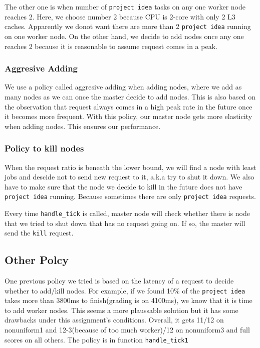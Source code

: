 \documentclass[11pt]{article}
\newcommand{\code}[1]{\texttt{#1}}
\begin{document}
The other one is when number of \code{project idea} tasks on any one worker node reaches 2.
Here, we choose number 2 because CPU is 2-core with only 2 L3 caches.
Apparently we donot want there are more than 2 \code{project idea} running on one worker node.
On the other hand, we decide to add nodes once any one reaches 2 because it is reasonable to assume request comes in a peak.

\subsubsection{Aggresive Adding} %
\label{ssub:aggresive_adding}
We use a policy called aggresive adding when adding nodes, where we add as many nodes as we can once the master decide to add nodes.
This is also based on the observation that request always comes in a high peak rate in the future once it becomes more frequent.
With this policy, our master node gets more elasticity when adding nodes.
This ensures our performance.

\subsubsection{Policy to kill nodes} %
\label{ssub:policy_to_kill_nodes}
When the request ratio is beneath the lower bound, we will find a node with least jobs and descide not to send new request to it, a.k.a try to shut it down.
We also have to make sure that the node we decide to kill in the future does not have \code{project idea} running.
Because sometimes there are only \code{project idea} requests.

Every time \code{handle\_tick} is called, master node will check whether there is node that we tried to shut down that has no request going on.
If so, the master will send the \code{kill} request.


\subsection{Other Polcy} %
\label{sub:other_pol}
One previous policy we tried is based on the latency of a request to decide whether to add/kill nodes.
For example, if we found 10\% of the \code{project idea} takes more than 3800ms to finish(grading is on 4100ms),
we know that it is time to add worker nodes.
This seems a more plaussable solution but it has some drawbacks under this assignment's conditions.
Overall, it gets 11/12 on nonuniform1 and 12-3(because of too much worker)/12 on nonuniform3 and full scores on all others.
The policy is in function \code{handle\_tick1}
\end{document}
